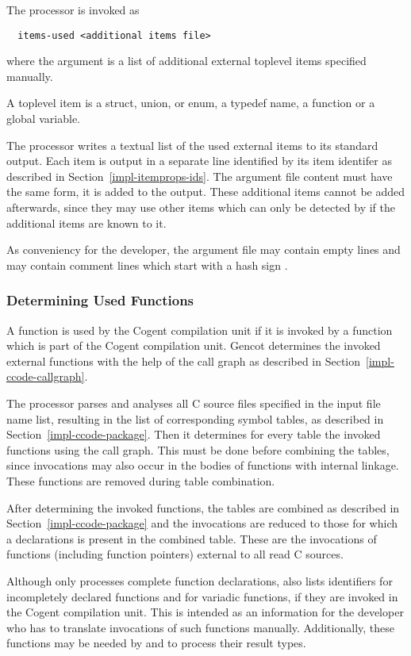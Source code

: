 The processor is invoked as
\begin{verbatim}
  items-used <additional items file>
\end{verbatim}
where the argument is a list of additional external toplevel items specified manually.

A toplevel item is a struct, union, or enum, a typedef name, a function or a global variable. 

The processor writes a textual list of the used external items to its standard output. Each item is output in a separate line 
identified by its item identifer as described in Section~\ref{impl-itemprops-ids}. The argument file content must have the 
same form, it is added to the output. These additional items cannot be added afterwards, since they may use other items
which can only be detected by  if the additional items are known to it.

As conveniency for the developer, the argument file may contain empty lines and may contain comment lines which
start with a hash sign \code{\#}.

\subsubsection{Determining Used Functions}

A function is used by the Cogent compilation unit if it is invoked by a function which is part of the Cogent compilation unit. 
Gencot determines the invoked external functions with the help of the call graph as described in 
Section~\ref{impl-ccode-callgraph}. 

The processor parses and analyses
all C source files specified in the input file name list, resulting in the list of corresponding symbol tables, as
described in Section~\ref{impl-ccode-package}. Then
it determines for every table the invoked functions using the call graph. This must
be done before combining the tables, since invocations may also occur in the bodies of functions with internal
linkage. These functions are removed during table combination.

After determining the invoked functions, the tables are combined as described in Section~\ref{impl-ccode-package}
and the invocations are reduced to those for
which a declarations is present in the combined table. These are the invocations of functions (including function pointers)
external to all read C sources. 

Although  only processes complete function declarations, 
 also lists identifiers for incompletely declared functions and for variadic functions,
if they are invoked in the Cogent compilation unit. This is intended as an 
information for the developer who has to translate invocations of such functions manually. Additionally, these functions
may be needed by  and  to process their result types.

